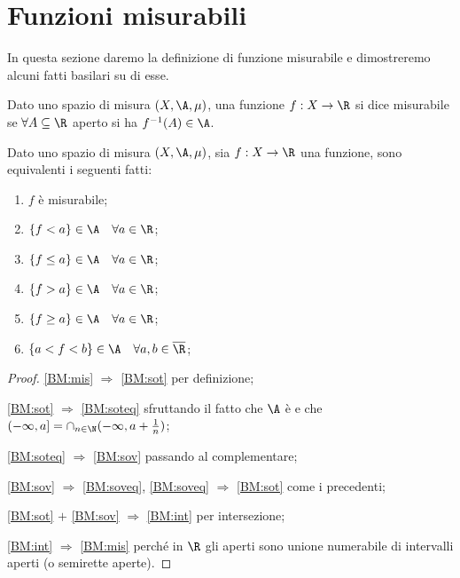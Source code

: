 \section{Funzioni misurabili}

In questa sezione daremo la definizione di funzione misurabile e dimostreremo alcuni fatti basilari su di esse.

\begin{definition}
	Dato uno spazio di misura $(X,\A,\mu)$, una funzione $f:X\rightarrow \R$ si dice misurabile se
	$\forall A \subseteq \R$ aperto si ha $f^{-1}(A)\in \A$.
\end{definition}

\begin{proposition}
	\label{BasicMis}
	Dato uno spazio di misura $(X,\A,\mu)$, sia $f:X\rightarrow \R$ una funzione, sono equivalenti i seguenti fatti:
	\begin{enumerate}
		\item $f$ è misurabile; \label{BM:mis}
		\item $\{f<a\}\in \A \quad \forall a\in \R$; \label{BM:sot}
		\item $\{f\leq a\}\in \A \quad \forall a\in \R$; \label{BM:soteq}
		\item $\{f>a\}\in \A \quad \forall a\in \R$; \label{BM:sov}
		\item $\{f\geq a\}\in \A \quad \forall a\in \R$;  \label{BM:soveq}
		\item $\{a<f<b\}\in \A \quad \forall a,b\in \overline{\R}$; \label{BM:int}
	\end{enumerate}
\end{proposition}
\begin{proof}
	\cref{BM:mis} $\Rightarrow$ \cref{BM:sot} per definizione;
	
	\cref{BM:sot} $\Rightarrow$ \cref{BM:soteq} sfruttando il fatto che $\A$ è \sigalg{} e che
	$(-\infty,a]=\cap_{n\in \N}(-\infty,a+\frac{1}{n})$;
	
	\cref{BM:soteq} $\Rightarrow$ \cref{BM:sov} passando al complementare;
	
	\cref{BM:sov} $\Rightarrow$ \cref{BM:soveq}, \cref{BM:soveq} $\Rightarrow$ \cref{BM:sot} come i precedenti;
	
	\cref{BM:sot} $+$ \cref{BM:sov} $\Rightarrow$ \cref{BM:int} per intersezione;
	
	\cref{BM:int} $\Rightarrow$ \cref{BM:mis} perché in $\R$ gli aperti sono unione numerabile di intervalli aperti (o semirette aperte).
\end{proof}

